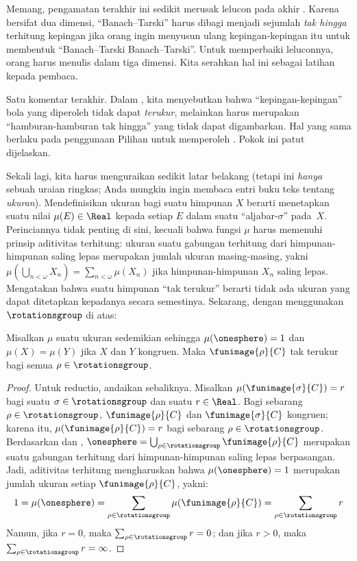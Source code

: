 \documentclass[../../../include/open-logic-section]{subfiles}
\begin{document}
Memang, pengamatan terakhir ini sedikit merusak lelucon pada akhir
. Karena bersifat dua dimensi, ``Banach--Tarski'' harus
dibagi menjadi sejumlah \emph{tak hingga} terhitung kepingan jika orang ingin
menyusun ulang kepingan-kepingan itu untuk membentuk
``Banach--Tarski Banach--Tarski''. Untuk memperbaiki leluconnya, orang
harus menulis dalam tiga dimensi. Kita serahkan hal ini sebagai latihan
kepada pembaca.

Satu komentar terakhir. Dalam , kita menyebutkan bahwa
``kepingan-kepingan'' bola yang diperoleh tidak dapat \emph{terukur},
melainkan harus merupakan ``hamburan-hamburan tak hingga'' yang tidak
dapat digambarkan. Hal yang sama berlaku pada penggunaan Pilihan untuk
memperoleh . Pokok ini patut dijelaskan.

Sekali lagi, kita harus menguraikan sedikit latar belakang (tetapi ini
\emph{hanya} sebuah uraian ringkas; Anda mungkin ingin membaca entri buku
teks tentang \emph{ukuran}). Mendefinisikan ukuran bagi suatu himpunan $X$
berarti menetapkan suatu nilai $\mu(E)\in\Real$ kepada setiap $E$ dalam
suatu ``aljabar-$\sigma$'' pada~$X$. Perinciannya tidak penting di sini,
kecuali bahwa fungsi $\mu$ harus memenuhi prinsip aditivitas terhitung:
ukuran suatu gabungan terhitung dari himpunan-himpunan saling lepas merupakan
jumlah ukuran masing-masing, yakni
$\mu(\bigcup_{n < \omega} X_n) = \sum_{n < \omega}\mu(X_n)$ jika
himpunan-himpunan $X_n$ saling lepas. Mengatakan bahwa suatu himpunan
``tak terukur'' berarti tidak ada ukuran yang dapat ditetapkan kepadanya
secara semestinya. Sekarang, dengan menggunakan $\rotationsgroup$ di atas:

\begin{cor}[Vitali]
Misalkan $\mu$ suatu ukuran sedemikian sehingga $\mu(\onesphere)=1$ dan
$\mu(X)=\mu(Y)$ jika $X$ dan $Y$ kongruen. Maka
$\funimage{\rho}{C}$ tak terukur bagi semua
$\rho\in\rotationsgroup$.
\end{cor}

\begin{proof}
Untuk reductio, andaikan sebaliknya. Misalkan
$\mu(\funimage{\sigma}{C})=r$ bagi suatu
$\sigma\in\rotationsgroup$ dan suatu $r\in\Real$. Bagi sebarang
$\rho\in\rotationsgroup$, $\funimage{\rho}{C}$ dan
$\funimage{\sigma}{C}$ kongruen; karena itu,
$\mu(\funimage{\rho}{C})=r$ bagi sebarang
$\rho\in\rotationsgroup$. Berdasarkan  dan
,
$\onesphere=\bigcup_{\rho\in\rotationsgroup}\funimage{\rho}{C}$ merupakan
suatu gabungan terhitung dari himpunan-himpunan saling lepas berpasangan.
Jadi, aditivitas terhitung mengharuskan bahwa $\mu(\onesphere)=1$ merupakan
jumlah ukuran setiap $\funimage{\rho}{C}$, yakni:
\[
	1 = \mu(\onesphere) =
	\sum_{\rho \in \rotationsgroup}\mu(\funimage{\rho}{C}) =
	\sum_{\rho \in \rotationsgroup}r
\]
Namun, jika $r=0$, maka
$\sum_{\rho\in\rotationsgroup}r=0$; dan jika $r>0$, maka
$\sum_{\rho\in\rotationsgroup}r=\infty$.
\end{proof}
\end{document}
